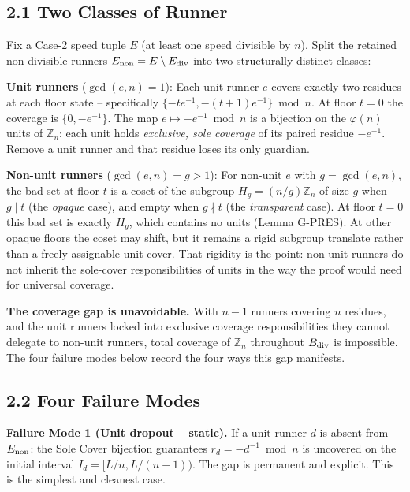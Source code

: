 \documentclass[11pt,a4paper]{article}
\theoremstyle{plain}
\theoremstyle{definition}
\theoremstyle{remark}
\begin{document}
\subsection{2.1 Two Classes of Runner}


Fix a Case-2 speed tuple $E$ (at least one speed divisible by $n$). Split the retained non-divisible runners $E_{\rm non} = E \setminus E_{\rm div}$ into two structurally distinct classes:

\textbf{Unit runners} ($\gcd(e,n) = 1$): Each unit runner $e$ covers exactly two residues at each floor state -- specifically $\{-te^{-1}, -(t+1)e^{-1}\} \bmod n$. At floor $t=0$ the coverage is $\{0, -e^{-1}\}$. The map $e \mapsto -e^{-1} \bmod n$ is a bijection on the $\varphi(n)$ units of $\mathbb{Z}_n$: each unit holds \textit{exclusive, sole coverage} of its paired residue $-e^{-1}$. Remove a unit runner and that residue loses its only guardian.

\textbf{Non-unit runners} ($\gcd(e,n) = g > 1$): For non-unit $e$ with $g = \gcd(e,n)$, the bad set at floor $t$ is a coset of the subgroup $H_g = (n/g)\mathbb{Z}_n$ of size $g$ when $g \mid t$ (the \textit{opaque} case), and empty when $g \nmid t$ (the \textit{transparent} case). At floor $t=0$ this bad set is exactly $H_g$, which contains no units (Lemma G-PRES). At other opaque floors the coset may shift, but it remains a rigid subgroup translate rather than a freely assignable unit cover. That rigidity is the point: non-unit runners do not inherit the sole-cover responsibilities of units in the way the proof would need for universal coverage.

\textbf{The coverage gap is unavoidable.} With $n-1$ runners covering $n$ residues, and the unit runners locked into exclusive coverage responsibilities they cannot delegate to non-unit runners, total coverage of $\mathbb{Z}_n$ throughout $B_{\rm div}$ is impossible. The four failure modes below record the four ways this gap manifests.


\subsection{2.2 Four Failure Modes}


\textbf{Failure Mode 1 (Unit dropout -- static).} If a unit runner $d$ is absent from $E_{\rm non}$: the Sole Cover bijection guarantees $r_d = -d^{-1} \bmod n$ is uncovered on the initial interval $I_d = [L/n, L/(n-1))$. The gap is permanent and explicit. This is the simplest and cleanest case.
\end{document}
